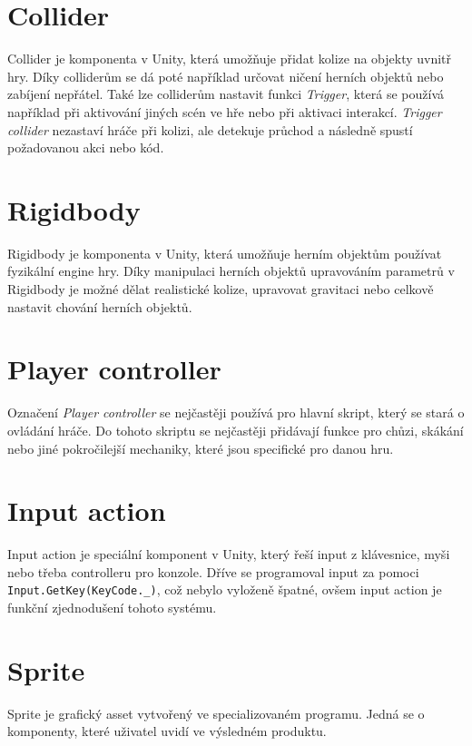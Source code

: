 \section{Collider}

Collider je komponenta v Unity, která umožňuje přidat kolize na objekty uvnitř hry. Díky colliderům se dá poté například určovat ničení herních objektů nebo zabíjení nepřátel. Také lze colliderům nastavit funkci \textit{Trigger}, která se používá například při aktivování jiných scén ve hře nebo při aktivaci interakcí. \textit{Trigger collider} nezastaví hráče při kolizi, ale detekuje průchod a následně spustí požadovanou akci nebo kód.

\section{Rigidbody}

Rigidbody je komponenta v Unity, která umožňuje herním objektům používat fyzikální engine hry. Díky manipulaci herních objektů upravováním parametrů v Rigidbody je možné dělat realistické kolize, upravovat gravitaci nebo celkově nastavit chování herních objektů.

\section{Player controller}

Označení \textit{Player controller} se nejčastěji používá pro hlavní skript, který se stará o ovládání hráče. Do tohoto skriptu se nejčastěji přidávají funkce pro chůzi, skákání nebo jiné pokročilejší mechaniky, které jsou specifické pro danou hru.

\section{Input action}

Input action je speciální komponent v Unity, který řeší input z klávesnice, myši nebo třeba controlleru pro konzole. Dříve se programoval input za pomoci \texttt{Input.GetKey(KeyCode.\_)}, což nebylo vyloženě špatné, ovšem input action je funkční zjednodušení tohoto systému.

\section{Sprite}

Sprite je grafický asset vytvořený ve specializovaném programu. Jedná se o komponenty, které uživatel uvidí ve výsledném produktu.

